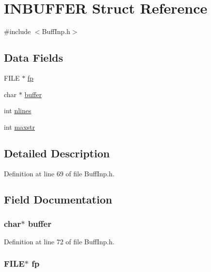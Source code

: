 \hypertarget{struct_i_n_b_u_f_f_e_r}{\section{I\-N\-B\-U\-F\-F\-E\-R Struct Reference}
\label{struct_i_n_b_u_f_f_e_r}
}


{\ttfamily \#include $<$Buff\-Inp.\-h$>$}

\subsection*{Data Fields}
\begin{DoxyCompactItemize}
\item 
F\-I\-L\-E $\ast$ \hyperlink{struct_i_n_b_u_f_f_e_r_aa065f30aa9f5f9a42132c82c787ee70b}{fp}
\item 
char $\ast$ \hyperlink{struct_i_n_b_u_f_f_e_r_aff2566f4c366b48d73479bef43ee4d2e}{buffer}
\item 
int \hyperlink{struct_i_n_b_u_f_f_e_r_af69ee38d2c862dbc6769fa27c5320b96}{nlines}
\item 
int \hyperlink{struct_i_n_b_u_f_f_e_r_a93ee708d9167216da4fecb84d98715c0}{maxstr}
\end{DoxyCompactItemize}


\subsection{Detailed Description}


Definition at line 69 of file Buff\-Inp.\-h.



\subsection{Field Documentation}
\hypertarget{struct_i_n_b_u_f_f_e_r_aff2566f4c366b48d73479bef43ee4d2e}{
\subsubsection[{buffer}]{\setlength{\rightskip}{0pt plus 5cm}char$\ast$ buffer}}\label{struct_i_n_b_u_f_f_e_r_aff2566f4c366b48d73479bef43ee4d2e}


Definition at line 72 of file Buff\-Inp.\-h.

\hypertarget{struct_i_n_b_u_f_f_e_r_aa065f30aa9f5f9a42132c82c787ee70b}{
\subsubsection[{fp}]{\setlength{\rightskip}{0pt plus 5cm}F\-I\-L\-E$\ast$ fp}}\label{struct_i_n_b_u_f_f_e_r_aa065f30aa9f5f9a42132c82c787ee70b}


